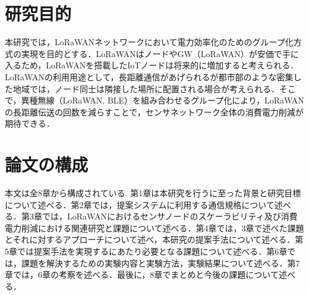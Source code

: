 \section{研究目的}
本研究では，LoRaWANネットワークにおいて電力効率化のためのグループ化方式の実現を目的とする．LoRaWANはノードやGW（LoRaWAN）が安価で手に入るため，LoRaWANを搭載したIoTノードは将来的に増加すると考えられる．LoRaWANの利用用途として，長距離通信があげられるが都市部のような密集した地域では，ノード同士は隣接した場所に配置される場合が考えられる．そこで，異種無線（LoRaWAN, BLE）を組み合わせるグループ化により，LoRaWANの長距離伝送の回数を減らすことで，センサネットワーク全体の消費電力削減が期待できる．

\section{論文の構成}
本文は全8章から構成されている. 第1章は本研究を行うに至った背景と研究目標について述べる．第2章では，提案システムに利用する通信規格について述べる．第3章では，LoRaWANにおけるセンサノードのスケーラビリティ及び消費電力削減における関連研究と課題について述べる．第4章では，3章で述べた課題とそれに対するアプローチについて述べ，本研究の提案手法について述べる．第5章では提案手法を実現するにあたり必要となる課題について述べる．第6章では，課題を解決するための実験内容と実験方法，実験結果について述べる．第7章では，6章の考察を述べる．最後に，8章でまとめと今後の課題について述べる．